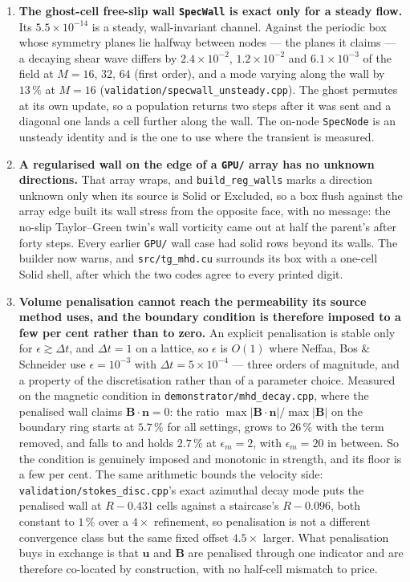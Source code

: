 \documentclass[11pt,a4paper]{article}
\newcommand{\code}[1]{\texttt{\small #1}}
\begin{document}
\begin{enumerate}[leftmargin=1.4em,itemsep=4pt]
\item \textbf{The ghost-cell free-slip wall \code{SpecWall} is exact only for a
  steady flow.} Its $5.5\times10^{-14}$ is a steady, wall-invariant channel.
  Against the periodic box whose symmetry planes lie halfway between nodes ---
  the planes it claims --- a decaying shear wave differs by $2.4\times10^{-2}$,
  $1.2\times10^{-2}$ and $6.1\times10^{-3}$ of the field at $M=16$, $32$, $64$
  (first order), and a mode varying along the wall by $13\,\%$ at $M=16$
  (\code{validation/specwall\_unsteady.cpp}). The ghost permutes at its own
  update, so a population returns two steps after it was sent and a diagonal
  one lands a cell further along the wall. The on-node \code{SpecNode} is an
  unsteady identity and is the one to use where the transient is measured.

\item \textbf{A regularised wall on the edge of a \code{GPU/} array has no
  unknown directions.} That array wraps, and \code{build\_reg\_walls} marks a
  direction unknown only when its source is Solid or Excluded, so a box flush
  against the array edge built its wall stress from the opposite face, with no
  message: the no-slip Taylor--Green twin's wall vorticity came out at half the
  parent's after forty steps. Every earlier \code{GPU/} wall case had solid rows
  beyond its walls. The builder now warns, and \code{src/tg\_mhd.cu} surrounds
  its box with a one-cell Solid shell, after which the two codes agree to every
  printed digit.

\item \textbf{Volume penalisation cannot reach the permeability its source
  method uses, and the boundary condition is therefore imposed to a few per cent
  rather than to zero.} An explicit penalisation is stable only for
  $\epsilon\gtrsim\Delta t$, and $\Delta t=1$ on a lattice, so $\epsilon$ is
  $O(1)$ where Neffaa, Bos \& Schneider use $\epsilon=10^{-3}$ with
  $\Delta t=5\times10^{-4}$ --- three orders of magnitude, and a property of the
  discretisation rather than of a parameter choice. Measured on the magnetic
  condition in \code{demonstrator/mhd\_decay.cpp}, where the penalised wall
  claims $\bm{B}\!\cdot\!\bm{n}=0$: the ratio
  $\max|\bm{B}\!\cdot\!\bm{n}|/\max|\bm{B}|$ on the boundary ring starts at
  $5.7\,\%$ for all settings, grows to $26\,\%$ with the term removed, and falls
  to and holds $2.7\,\%$ at $\epsilon_m=2$, with $\epsilon_m=20$ in between. So
  the condition is genuinely imposed and monotonic in strength, and its floor is
  a few per cent. The same arithmetic bounds the velocity side:
  \code{validation/stokes\_disc.cpp}'s exact azimuthal decay mode puts the
  penalised wall at $R-0.431$ cells against a staircase's $R-0.096$, both
  constant to $1\,\%$ over a $4\times$ refinement, so penalisation is not a
  different convergence class but the same fixed offset $4.5\times$ larger. What penalisation buys in
  exchange is that $\bm{u}$ and $\bm{B}$ are penalised through one indicator and
  are therefore co-located by construction, with no half-cell mismatch to price.


\end{enumerate}
\end{document}
